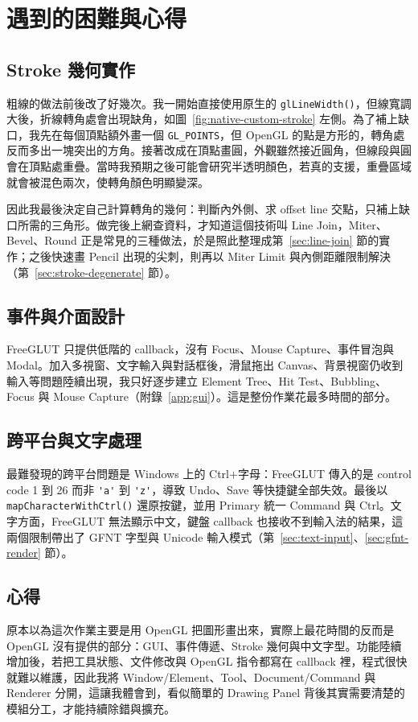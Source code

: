 \section{遇到的困難與心得}

\subsection{Stroke 幾何實作}

粗線的做法前後改了好幾次。我一開始直接使用原生的 \lstinline|glLineWidth()|，但線寬調大後，折線轉角處會出現缺角，如圖~\ref{fig:native-custom-stroke} 左側。為了補上缺口，我先在每個頂點額外畫一個 \lstinline|GL_POINTS|，但 OpenGL 的點是方形的，轉角處反而多出一塊突出的方角。接著改成在頂點畫圓，外觀雖然接近圓角，但線段與圓會在頂點處重疊。當時我預期之後可能會研究半透明顏色，若真的支援，重疊區域就會被混色兩次，使轉角顏色明顯變深。

因此我最後決定自己計算轉角的幾何：判斷內外側、求 offset line 交點，只補上缺口所需的三角形。做完後上網查資料，才知道這個技術叫 Line Join，Miter、Bevel、Round 正是常見的三種做法，於是照此整理成第~\ref{sec:line-join} 節的實作；之後快速畫 Pencil 出現的尖刺，則再以 Miter Limit 與內側距離限制解決（第~\ref{sec:stroke-degenerate} 節）。

\subsection{事件與介面設計}

FreeGLUT 只提供低階的 callback，沒有 Focus、Mouse Capture、事件冒泡與 Modal。加入多視窗、文字輸入與對話框後，滑鼠拖出 Canvas、背景視窗仍收到輸入等問題陸續出現，我只好逐步建立 Element Tree、Hit Test、Bubbling、Focus 與 Mouse Capture（附錄~\ref{app:gui}）。這是整份作業花最多時間的部分。

\subsection{跨平台與文字處理}

最難發現的跨平台問題是 Windows 上的 Ctrl+字母：FreeGLUT 傳入的是 control code 1 到 26 而非 \lstinline|'a'| 到 \lstinline|'z'|，導致 Undo、Save 等快捷鍵全部失效。最後以 \lstinline|mapCharacterWithCtrl()| 還原按鍵，並用 Primary 統一 Command 與 Ctrl。文字方面，FreeGLUT 無法顯示中文，鍵盤 callback 也接收不到輸入法的結果，這兩個限制帶出了 GFNT 字型與 Unicode 輸入模式（第~\ref{sec:text-input}、\ref{sec:gfnt-render} 節）。

\subsection{心得}

原本以為這次作業主要是用 OpenGL 把圖形畫出來，實際上最花時間的反而是 OpenGL 沒有提供的部分：GUI、事件傳遞、Stroke 幾何與中文字型。功能陸續增加後，若把工具狀態、文件修改與 OpenGL 指令都寫在 callback 裡，程式很快就難以維護，因此我將 Window/Element、Tool、Document/Command 與 Renderer 分開，這讓我體會到，看似簡單的 Drawing Panel 背後其實需要清楚的模組分工，才能持續除錯與擴充。
